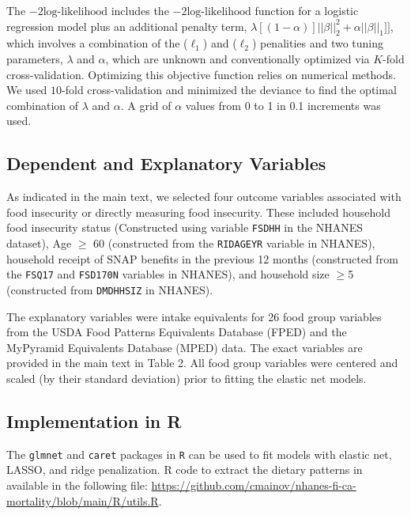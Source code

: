 \documentclass{article}
\begin{document}
The $-2\text{log-likelihood}$ includes the $-2\text{log-likelihood}$ function for a logistic regression model plus an additional penalty term, $\lambda[(1-\alpha)]||\beta||_2^2+\alpha||\beta||_1]]$, which involves a combination of the ($\ell_1$) and ($\ell_2$) penalities and two tuning parameters, $\lambda$ and $\alpha$, which are unknown and conventionally optimized via $K$-fold cross-validation. Optimizing this objective function relies on numerical methods. \supercite{jin2009elastic} We used $10$-fold cross-validation and minimized the deviance to find the optimal combination of $\lambda$ and $\alpha$. A grid of $\alpha$ values from 0 to 1 in 0.1 increments was used. 

\subsection{Dependent and Explanatory Variables}
 \hspace{\parindent} As indicated in the main text, we selected four outcome variables associated with food insecurity or directly measuring food insecurity. These included household food insecurity status (Constructed using variable \texttt{FSDHH} in the NHANES dataset), Age $\ge$ 60 (constructed from the \texttt{RIDAGEYR} variable in NHANES), household receipt of SNAP benefits in the previous 12 months (constructed from the \texttt{FSQ17} and \texttt{FSD170N} variables in NHANES), and household size $\ge$5 (constructed from \texttt{DMDHHSIZ} in NHANES).
 
  \hspace{\parindent} The explanatory variables were intake equivalents for 26 food group variables from the USDA Food Patterns Equivalents Database (FPED) and the MyPyramid Equivalents Database (MPED) data. The exact variables are provided in the main text in Table 2. All food group variables were centered and scaled (by their standard deviation) prior to fitting the elastic net models.
 
\subsection{Implementation in R}
 \hspace{\parindent} The \texttt{glmnet} and \texttt{caret} packages in \texttt{R} can be used to fit models with elastic net, LASSO, and ridge penalization. R code to extract the dietary patterns in available in the following file: \textcolor{blue}{\url{https://github.com/cmainov/nhanes-fi-ca-mortality/blob/main/R/utils.R}}.
\end{document}
